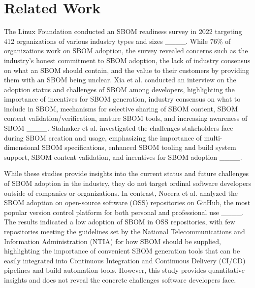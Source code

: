 \section{Related Work}
\label{sec:related}

The Linux Foundation conducted an SBOM readiness survey in 2022 targeting 412 organizations of various industry types and sizes ____. While 76\% of organizations work on SBOM adoption, the survey revealed concerns such as the industry's honest commitment to SBOM adoption, the lack of industry consensus on what an SBOM should contain, and the value to their customers by providing them with an SBOM being unclear. Xia et al. conducted an interview on the adoption status and challenges of SBOM among developers, highlighting the importance of incentives for SBOM generation, industry consensus on what to include in SBOM, mechanisms for selective sharing of SBOM content, SBOM content validation/verification, mature SBOM tools, and increasing awareness of SBOM ____. Stalnaker et al. investigated the challenges stakeholders face during SBOM creation and usage, emphasizing the importance of multi-dimensional SBOM specifications, enhanced SBOM tooling and build system support, SBOM content validation, and incentives for SBOM adoption ____.

While these studies provide insights into the current status and future challenges of SBOM adoption in the industry, they do not target ordinal software developers outside of companies or organizations. In contrast, Nocera et al. analyzed the SBOM adoption on open-source software (OSS) repositories on GitHub, the most popular version control platform for both personal and professional use ____. The results indicated a low adoption of SBOM in OSS repositories, with few repositories meeting the guidelines set by the National Telecommunications and Information Administration (NTIA) for how SBOM should be supplied, highlighting the importance of convenient SBOM generation tools that can be easily integrated into Continuous Integration and Continuous Delivery (CI/CD) pipelines and build-automation tools. However, this study provides quantitative insights and does not reveal the concrete challenges software developers face.